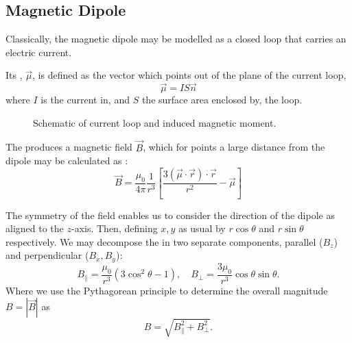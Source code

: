 \subsection{Magnetic Dipole}
Classically, the magnetic dipole may be modelled as a closed loop that carries an
electric current. 

Its , $\vec{\mu}$, is defined as the vector which points out of the plane
of the current loop, 
\begin{equation}
    \vec{\mu} = IS \vec{n}
    \label{eq:dipole_moment}
\end{equation}
where $I$ is the current in, and $S$ the surface area enclosed by, the loop. 

\begin{wrapfigure}{l}{0.4\textwidth}%
    \centering%
        
  \caption{Schematic of current loop and induced magnetic moment.}%
\end{wrapfigure}%


The  produces a magnetic field $\vec{B}$, which for points a large distance from the dipole may be calculated as \cite{Griffiths2012-pt}:
\begin{equation}
    \vec{B} = \frac{\mu_0}{4\pi} \frac{1}{r^3} \left[\frac{3(\vec{\mu} \cdot \vec{r}) \cdot \vec{r}}{r^2} - \vec{\mu}\right]
    \label{eq:}
\end{equation}

The symmetry of the field enables us to consider the direction of the dipole as aligned to the $z$-axis. Then, defining $x,y$ as usual by $r \cos\theta$ and $r \sin\theta$ respectively. We may decompose the  in two separate components, parallel ($B_z$) and perpendicular ($B_x, B_y$): 
$$B_\parallel =\frac{\mu_0}{r^3}(3\cos^2 \theta - 1), \quad B_\perp = \frac{3\mu_0}{r^3}\cos\theta\sin\theta.$$
Where we use the Pythagorean principle to determine the overall magnitude $B = |\vec{B}|$ as
$$B = \sqrt{B_\parallel^2 + B_\perp^2}.$$
